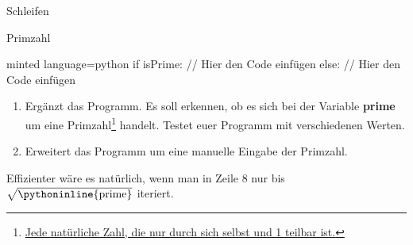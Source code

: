 \begin{task}[points=auto]{Schleifen}
\begin{subtask*}[points=0]{Primzahl }
\begin{codeBlock}[]{minted language=python}
                if isPrime:
                    // Hier den Code einfügen
                else:
                    // Hier den Code einfügen
        \end{codeBlock}
        \begin{enumerate}
            \item Ergänzt das Programm. Es soll erkennen, ob es sich bei der Variable \textbf{prime} um eine Primzahl\footnote{\href{https://de.wikipedia.org/wiki/Primzahl}{Jede natürliche Zahl, die nur durch sich selbst und 1 teilbar ist.}} handelt. Testet euer Programm mit verschiedenen Werten.
            \item Erweitert das Programm um eine manuelle Eingabe der Primzahl.
        \end{enumerate}

        \begin{solution}
            \begin{anmerkung}
                Effizienter wäre es natürlich, wenn man in Zeile 8 nur bis $\sqrt{\text{\pythoninline{prime}}}$ iteriert.
            \end{anmerkung}
        \end{solution}
    \end{subtask*}
\end{task}
